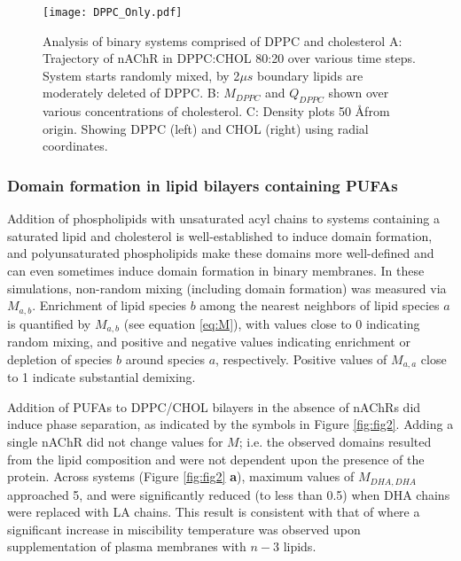 \begin{figure*}[h!]
	\center
	\texttt{[image: DPPC\_Only.pdf]}
	\caption{Analysis of binary systems comprised of DPPC and cholesterol A: Trajectory of nAChR in DPPC:CHOL 80:20 over various time steps. System starts randomly mixed, by 2$\mu s$ boundary lipids are moderately deleted of DPPC. B: $M_{DPPC}$ and $Q_{DPPC}$ shown over various concentrations of cholesterol. C: Density plots 50 \AA from origin. Showing DPPC (left) and CHOL (right) using radial coordinates.}
	\label{fig:binary}
\end{figure*} 

\subsubsection {Domain formation in lipid bilayers containing PUFAs} \label{Demix}

	Addition of phospholipids with unsaturated acyl chains to systems containing a saturated lipid and cholesterol is well-established to induce domain formation, and polyunsaturated phospholipids make these domains more well-defined\cite{levitalraft} and can even sometimes induce domain formation in binary membranes.\cite{weirdpaper} In these simulations, non-random mixing (including domain formation) was measured via $M_{a,b}$.  Enrichment of lipid species $b$ among the nearest neighbors of lipid species $a$ is quantified by $M_{a,b}$ (see equation \ref{eq:M}), with values close to 0 indicating random mixing, and positive and negative values indicating enrichment or depletion of species $b$ around species $a$, respectively.  Positive values of $M_{a,a}$ close to 1 indicate substantial demixing.  
	
	Addition of PUFAs to DPPC/CHOL bilayers in the absence of nAChRs did induce phase separation, as indicated by the symbols in Figure \ref{fig:fig2}.  Adding a single nAChR did not change values for $M$; i.e. the observed domains resulted from the lipid composition and were not dependent upon the presence of the protein.  Across systems (Figure \ref{fig:fig2} \textbf{a}), maximum values of $M_{DHA,DHA}$ approached 5, and were significantly reduced (to less than 0.5) when DHA chains were replaced with LA chains. This result is consistent with that of \cite{Levental_Polyunsaturated_2016} where a significant increase in miscibility temperature was observed upon supplementation of plasma membranes with $n-3$ lipids.  
	
